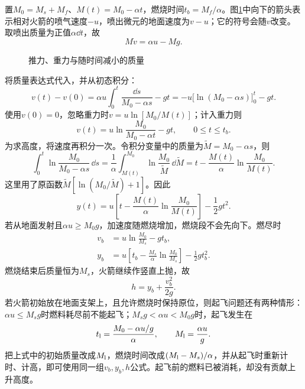 \begin{solution}
置$M_0=M_s+M_f$、$M(t)=M_0-\alpha t$，燃烧时间$t_b=M_f/\alpha$。图\ref{fig:hw3-6-s}中向下的箭头表示相对火箭的喷气速度$-u$，喷出微元的地面速度为$v-u$；它的符号会随$v$改变。取喷出质量为正值$\alpha\dd t$，故
\[
 M\dot v=\alpha u-Mg.
\]

\begin{figure}[H]\centering
{}
\caption{推力、重力与随时间减小的质量}\label{fig:hw3-6-s}
\end{figure}

将质量表达式代入，并从初态积分：
\[
v(t)-v(0)=\alpha u\int_0^t\frac{\dd s}{M_0-\alpha s}-gt
=-u\bigl[\ln(M_0-\alpha s)\bigr]_0^t-gt.
\]
使用$v(0)=0$，忽略重力时$\boxed{v=u\ln[M_0/M(t)]}$；计入重力则
\[
 \boxed{v(t)=u\ln\frac{M_0}{M_0-\alpha t}-gt},\qquad 0\le t\le t_b.
\]
为求高度，将速度再积分一次。令积分变量中的质量为$\widetilde M=M_0-\alpha s$，则
\[
\int_0^t\ln\frac{M_0}{M_0-\alpha s}\,\dd s
=\frac1\alpha\int_{M(t)}^{M_0}\ln\frac{M_0}{\widetilde M}\,\dd\widetilde M
=t-\frac{M(t)}\alpha\ln\frac{M_0}{M(t)}.
\]
这里用了原函数$\widetilde M[\ln(M_0/\widetilde M)+1]$。因此
\[
y(t)=u\left[t-\frac{M(t)}\alpha\ln\frac{M_0}{M(t)}\right]-\frac12gt^2.
\]
若从地面发射且$\alpha u\ge M_0g$，加速度随燃烧增加，燃烧段不会先向下。燃尽时
\begin{align*}
 v_b&=u\ln\frac{M_0}{M_s}-gt_b,\\
 y_b&=u\left[t_b-\frac{M_s}{\alpha}\ln\frac{M_0}{M_s}\right]-\frac12gt_b^2.
\end{align*}
燃烧结束后质量恒为$M_s$，火箭继续作竖直上抛，故
\[
 \boxed{h=y_b+\frac{v_b^2}{2g}}.
\]
若火箭初始放在地面支架上，且允许燃烧时保持原位，则起飞问题还有两种情形：$\alpha u\le M_sg$时燃料耗尽前不能起飞；$M_sg<\alpha u<M_0g$时，起飞发生在
\[
 t_{\rm l}=\frac{M_0-\alpha u/g}{\alpha},\qquad
 M_{\rm l}=\frac{\alpha u}{g}.
\]
把上式中的初始质量改成$M_{\rm l}$，燃烧时间改成$(M_{\rm l}-M_s)/\alpha$，并从起飞时重新计时、计高，即可使用同一组$v_b,y_b,h$公式。起飞前的燃料已被消耗，却没有贡献上升高度。


\end{solution}
